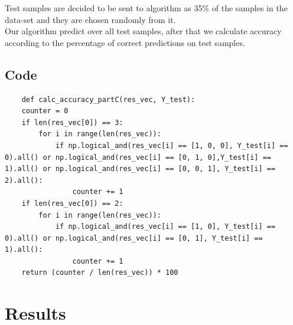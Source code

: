 \documentclass[11pt]{article}
\begin{document}
Test samples are decided to be sent to algorithm as 35\% of the samples in the data-set and they are chosen randomly from it.\\
Our algorithm predict over all test samples, after that we calculate accuracy according to the percentage of correct predictions on test samples.\\

\subsection{Code}
\begin{lstlisting}
    def calc_accuracy_partC(res_vec, Y_test):
    counter = 0
    if len(res_vec[0]) == 3:
        for i in range(len(res_vec)):
            if np.logical_and(res_vec[i] == [1, 0, 0], Y_test[i] == 0).all() or np.logical_and(res_vec[i] == [0, 1, 0],Y_test[i] == 1).all() or np.logical_and(res_vec[i] == [0, 0, 1], Y_test[i] == 2).all():
                counter += 1
    if len(res_vec[0]) == 2:
        for i in range(len(res_vec)):
            if np.logical_and(res_vec[i] == [1, 0], Y_test[i] == 0).all() or np.logical_and(res_vec[i] == [0, 1], Y_test[i] == 1).all():
                counter += 1
    return (counter / len(res_vec)) * 100
\end{lstlisting}


\section{Results}
\end{document}
